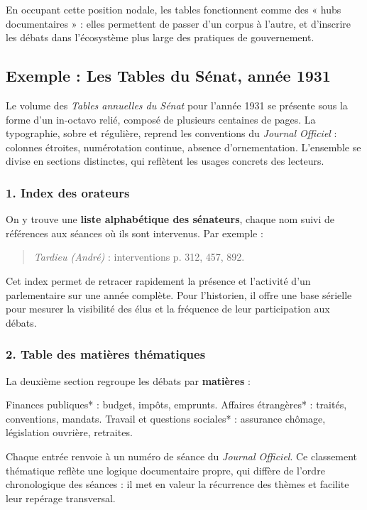 En occupant cette position nodale, les tables fonctionnent comme des « hubs documentaires » : elles permettent de passer d’un corpus à l’autre, et d’inscrire les débats dans l’écosystème plus large des pratiques de gouvernement.

\subsection{Exemple : Les Tables du Sénat, année 1931}

Le volume des \emph{Tables annuelles du Sénat} pour l’année 1931 se présente sous la forme d’un in-octavo relié, composé de plusieurs centaines de pages. La typographie, sobre et régulière, reprend les conventions du \emph{Journal Officiel} : colonnes étroites, numérotation continue, absence d’ornementation. L’ensemble se divise en sections distinctes, qui reflètent les usages concrets des lecteurs.

\subsubsection{1. Index des orateurs}

On y trouve une \textbf{liste alphabétique des sénateurs}, chaque nom suivi de références aux séances où ils sont intervenus. Par exemple :

\begin{quote}\emph{Tardieu (André)} : interventions p. 312, 457, 892.\end{quote}

Cet index permet de retracer rapidement la présence et l’activité d’un parlementaire sur une année complète. Pour l’historien, il offre une base sérielle pour mesurer la visibilité des élus et la fréquence de leur participation aux débats.

\subsubsection{2. Table des matières thématiques}

La deuxième section regroupe les débats par \textbf{matières} :

\emph{ }Finances publiques* : budget, impôts, emprunts.
\emph{ }Affaires étrangères* : traités, conventions, mandats.
\emph{ }Travail et questions sociales* : assurance chômage, législation ouvrière, retraites.

Chaque entrée renvoie à un numéro de séance du \emph{Journal Officiel}. Ce classement thématique reflète une logique documentaire propre, qui diffère de l’ordre chronologique des séances : il met en valeur la récurrence des thèmes et facilite leur repérage transversal.

